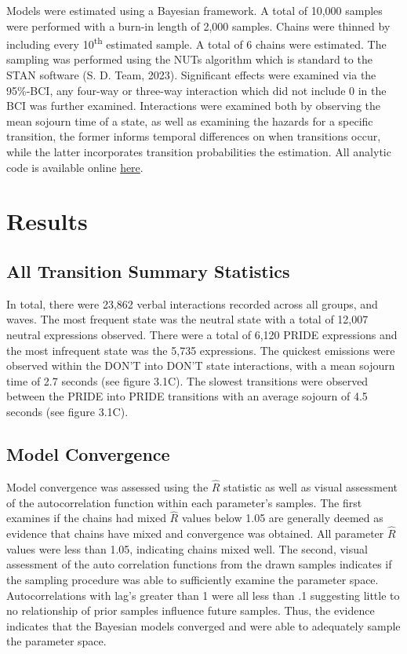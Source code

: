 \documentclass[12pt]{./styles/outhesis}
\begin{document}
Models were estimated using a Bayesian framework. A total of 10,000
samples were performed with a burn-in length of 2,000 samples. Chains
were thinned by including every 10\textsuperscript{th} estimated sample. A total of 6
chains were estimated. The sampling was performed using the NUTs
algorithm which is standard to the STAN software (S. D. Team, 2023).
Significant effects were examined via the 95\%-BCI, any four-way or
three-way interaction which did not include 0 in the BCI was further
examined. Interactions were examined both by observing the mean sojourn
time of a state, as well as examining the hazards for a specific
transition, the former informs temporal differences on when transitions
occur, while the latter incorporates transition probabilities the
estimation. All analytic code is available online
\href{https://github.com/adrose/oregonDPICS/blob/main/scripts/brmsSkel.R}{here}.

\section{Results}\label{results-1}

\subsection{All Transition Summary Statistics}
In total, there were 23,862 verbal interactions recorded across all
groups, and waves. The most frequent state was the neutral state with a
total of 12,007 neutral expressions observed. There were a total of
6,120 PRIDE expressions and the most infrequent state was the 5,735
expressions. The quickest emissions were observed within the DON'T into
DON'T state interactions, with a mean sojourn time of 2.7 seconds (see
figure 3.1C). The slowest transitions were observed between the PRIDE
into PRIDE transitions with an average sojourn of 4.5 seconds (see
figure 3.1C).

\subsection{Model Convergence}
Model convergence was assessed using the \(\hat{R}\) statistic as well
as visual assessment of the autocorrelation function within each
parameter's samples. The first examines if the chains had mixed
\(\hat{R}\) values below 1.05 are generally deemed as evidence that
chains have mixed and convergence was obtained. All parameter
\(\hat{R}\) values were less than 1.05, indicating chains mixed well.
The second, visual assessment of the auto correlation functions from the
drawn samples indicates if the sampling procedure was able to
sufficiently examine the parameter space. Autocorrelations with lag's
greater than 1 were all less than .1 suggesting little to no
relationship of prior samples influence future samples. Thus, the
evidence indicates that the Bayesian models converged and were able to
adequately sample the parameter space.
\end{document}
